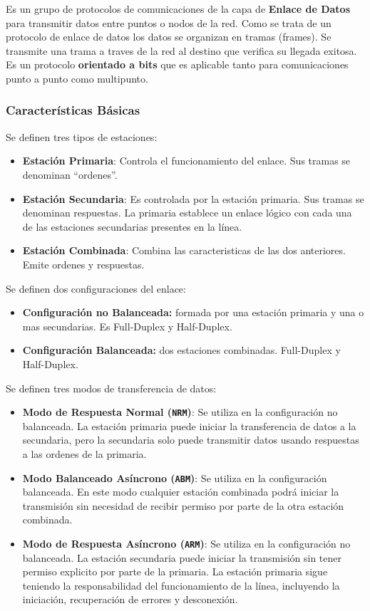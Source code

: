 Es un grupo de protocolos de comunicaciones de la capa de \textbf{Enlace de Datos} para transmitir datos entre puntos o nodos de la red. Como se trata de un protocolo de enlace de datos los datos se organizan en tramas (frames).  Se transmite una trama a traves de la red al destino que verifica su llegada exitosa. Es un protocolo \textbf{orientado a bits} que es aplicable tanto para comunicaciones punto a punto como multipunto.
\subsubsection*{Características Básicas}
Se definen tres tipos de estaciones:
\begin{itemize}
\item \textbf{Estación Primaria}: Controla el funcionamiento del enlace. Sus tramas se denominan ``ordenes''.
\item \textbf{Estación Secundaria}: Es controlada por la estación primaria. Sus tramas se denominan respuestas. La primaria establece un enlace lógico con cada una de las estaciones secundarias presentes en la línea.
\item \textbf{Estación Combinada}: Combina las caracteristicas de las dos anteriores. Emite ordenes y respuestas.
\end{itemize}
Se definen dos configuraciones del enlace:
\begin{itemize}
\item \textbf{Configuración no Balanceada:} formada por una estación primaria y una o mas secundarias. Es Full-Duplex y Half-Duplex.
\item \textbf{Configuración Balanceada:} dos estaciones combinadas. Full-Duplex y Half-Duplex.
\end{itemize}
Se definen tres modos de transferencia de datos:
\begin{itemize}
\item \textbf{Modo de Respuesta Normal (\texttt{NRM})}: Se utiliza en la configuración no balanceada. La estación primaria puede iniciar la transferencia de datos a la secundaria, pero la secundaria solo puede transmitir datos usando respuestas a las ordenes de la primaria.
\item \textbf{Modo Balanceado Asíncrono (\texttt{ABM})}: Se utiliza en la configuración balanceada. En este modo cualquier estación combinada podrá iniciar la transmisión sin necesidad de recibir permiso por parte de la otra estación combinada.
\item \textbf{Modo de Respuesta Asíncrono (\texttt{ARM})}: Se utiliza en la configuración no balanceada. La estación secundaria puede iniciar la transmisión sin tener permiso explicito por parte de la primaria. La estación primaria sigue teniendo la responsabilidad del funcionamiento de la línea, incluyendo la iniciación, recuperación de errores y desconexión.
\end{itemize}


